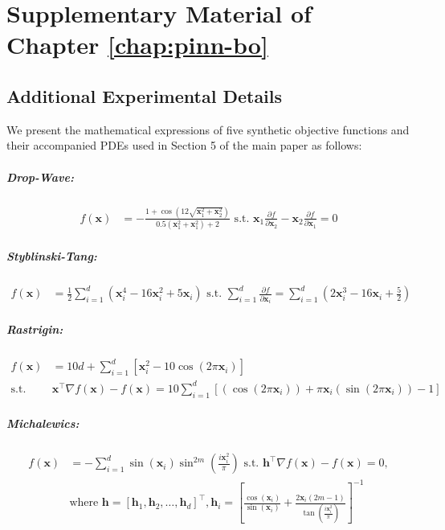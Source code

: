 \allowdisplaybreaks
\chapter{Supplementary Material of Chapter \ref{chap:pinn-bo}} 
\label{section:pinn-bo_supp}
\section{Additional Experimental Details}
\label{section:pinn-bo_experiments_synthetic}
We present the mathematical expressions of five synthetic objective functions and their accompanied PDEs used in Section 5 of the main paper as follows: 
\paragraph{Drop-Wave:} 
\begin{align*}
    f(\mathbf{x}) &= - \frac{1 + \cos(12\sqrt{\mathbf{x}_1^2 + \mathbf{x}_2^2})}{0.5(\mathbf{x}_1^2 + \mathbf{x}_1^2) + 2} \text{ s.t. } \mathbf{x}_1 \frac{\partial f}{\partial \mathbf{x}_2} - \mathbf{x}_2 \frac{\partial f}{\partial \mathbf{x}_1} = 0
\end{align*}
\paragraph{Styblinski-Tang:}
\begin{align*}
        f(\mathbf{x}) &= \frac{1}{2} \sum_{i=1}^{d} (\mathbf{x}_i^4 - 16\mathbf{x}_i^2 + 5\mathbf{x}_i) \text{ s.t. }  \sum_{i=1}^d \frac{\partial f}{\partial \mathbf{x}_i} = \sum_{i=1}^{d}(2\mathbf{x}_i^3 -16\mathbf{x}_i +\frac{5}{2})
\end{align*}

\paragraph{Rastrigin:}
\begin{align*}
        f(\mathbf{x}) &= 10d + \sum_{i=1}^{d} \left[ \mathbf{x}_i^2 - 10 \cos(2\pi \mathbf{x}_i) \right] 
        \\
        \text{s.t. }  &\mathbf{x}^\top \nabla f(\mathbf{x})  - f(\mathbf{x}) = 10\sum_{i=1}^d \left[ (\cos(2\pi \mathbf{x}_i)) + \pi \mathbf{x}_i (\sin(2\pi \mathbf{x}_i)) - 1 \right]
\end{align*}
\paragraph{Michalewics:}
\begin{align*}
        f(\mathbf{x}) &= -\sum_{i=1}^{d} \sin(\mathbf{x}_i) \sin^{2m}\left(\frac{i\mathbf{x}_i^2}{\pi}\right) \text{ s.t. } \mathbf{h}^\top \nabla f(\mathbf{x}) - f(\mathbf{x}) = 0,\\ & \text{where } \mathbf{h} = [\mathbf{h}_1, \mathbf{h}_2, \dots, \mathbf{h}_d]^\top, \mathbf{h}_i = \left[\frac{\cos(\mathbf{x}_i)}{\sin(\mathbf{x}_i)} + \frac{2\mathbf{x}_i (2m-1)}{\tan(\frac{i\mathbf{x}_i^2}{\pi})}\right]^{-1}
\end{align*}
